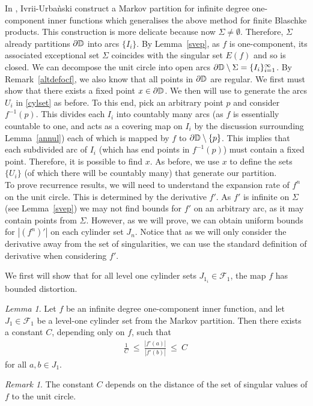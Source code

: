 \documentclass[11pt,reqno]{amsart}
\newcommand{\D}{{\Bbb D}}
\newcommand{\0}{\mathbf{0}}
\newtheorem{lemma}{Lemma}
\theoremstyle{remark}
\newtheorem{remark}{{Remark}}
\numberwithin{equation}{section}
\newtheorem{lemma}[theorem]{Lemma}
\theoremstyle{remark}
\newtheorem*{remark}{Remark}
\numberwithin{equation}{section}
\begin{document}
In \cite[\S8]{urb},  Ivrii-Urba\`nski construct a Markov partition for infinite degree one-component inner functions which generalises the above method for finite Blaschke products. This construction is more delicate because now $\Sigma \neq \emptyset$.  Therefore, $\Sigma$ already partitions $\partial \D$ into arcs $\{I_i\}$. By Lemma~\ref{svep}, as $f$ is one-component, its associated exceptional set $\Sigma$ coincides with the singular set $E(f)$ and so is closed. We can decompose the unit circle into open arcs $\partial \D \setminus \Sigma = \{I_i\}_{i=1}^\infty$. By Remark~\ref{altdefocf}, we also know that all points in $\partial \D $ are regular.
We first must show that there exists a fixed point $x \in \partial \D$. We then will use to generate the arcs $U_i$ in \eqref{cylset} as before. 
To this end, pick an arbitrary point $p$ and consider $f^{-1}(p)$. This divides each $I_i$ into countably many arcs (as $f$ is essentially countable to one, and acts as a covering map on $I_i$ by the discussion surrounding Lemma~\ref{annul}) each of which is mapped by $f$ to $\partial \D \setminus \{p\}$. This implies that each subdivided arc of $I_i$ (which has end points in $f^{-1}(p)$) must contain a fixed point. 
Therefore, it is possible to find $x$.  As before, we use $x$ to define the sets $\{U_i\}$ (of which there will be countably many) that generate our partition.
\\

To prove recurrence results, we will need to understand the expansion rate of $f^n$ on the unit circle. This is determined by the derivative $f'$. As $f'$ is infinite on $\Sigma$ (see Lemma~\ref{svep}) we may not find bounds for $f'$ on an arbitrary arc, as it may contain points from $\Sigma$. However, as we will prove, we can obtain uniform bounds for $|(f^n)'|$ on each cylinder set $J_n$. Notice that as we will only consider the derivative away from the set of singularities, we can use the standard definition of derivative when considering $f'$.


We first will show that for all level one cylinder sets $J_{1_i} \in \mathcal{F}_1$, the map $f$ has bounded distortion.
\begin{lemma}\label{bdddist} Let $f$ be an infinite degree one-component inner function, and let $J_1 \in \mathcal{F}_1$ be a level-one cylinder set from the Markov partition. Then there exists a constant $C$, depending only on $f$, such that 
\begin{eqnarray}\label{bod1}
    \frac{1}{C} \: \leq \: \frac{|f'(a)|}{|f'(b)|}\:  \leq \: C \, 
\end{eqnarray}
for all $a,b \in J_1$.
\end{lemma}
\begin{remark}
    The constant $C$ depends on the distance of the set of singular values of $f$ to the unit circle.
\end{remark}
\end{document}
